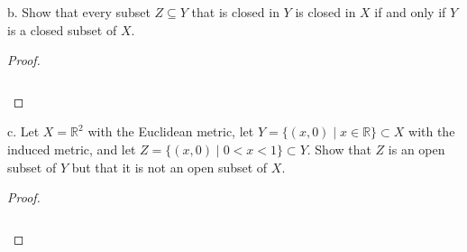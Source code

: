 \pagebreak

b.  Show that every subset $Z \subseteq Y$ that is closed in $Y$ is closed in $X$ if and only if $Y$ is a closed subset
    of $X$.

\begin{proof}\renewcommand{\qedsymbol}{}\ \\\\
    \begin{align*}
    \end{align*}
\end{proof}

\pagebreak

c.  Let $X = \mathbb{R}^2$ with the Euclidean metric, let $Y = \{(x, 0) \mid x \in \mathbb{R} \} \subset X$ with the
    induced metric, and let $Z = \{(x, 0) \mid 0 < x < 1 \} \subset Y$. Show that $Z$ is an open subset of $Y$ but that
    it is not an open subset of $X$.

\begin{proof}\renewcommand{\qedsymbol}{}\ \\\\
    \begin{align*}
    \end{align*}
\end{proof}

\pagebreak